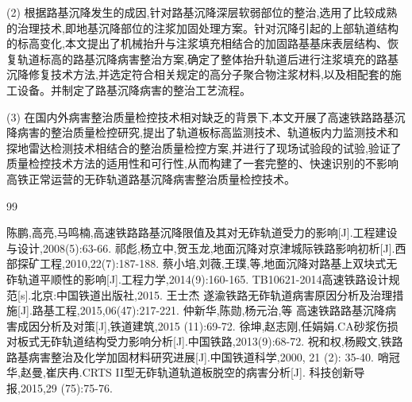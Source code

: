 \documentclass[a4paper,12pt]{ctexrep}
\begin{document}
(2) 根据路基沉降发生的成因,针对路基沉降深层软弱部位的整治,选用了比较成熟的治理技术,即地基沉降部位的注浆加固处理方案。针对沉降引起的上部轨道结构的标高变化,本文提出了机械抬升与注浆填充相结合的加固路基基床表层结构、恢复轨道标高的路基沉降病害整治方案,确定了整体抬升轨道后进行注浆填充的路基沉降修复技术方法,并选定符合相关规定的高分子聚合物注浆材料,以及相配套的施工设备。并制定了路基沉降病害的整治工艺流程。

(3) 在国内外病害整治质量检控技术相对缺乏的背景下,本文开展了高速铁路路基沉降病害的整治质量检控研究,提出了轨道板标高监测技术、轨道板内力监测技术和探地雷达检测技术相结合的整治质量检控方案,并进行了现场试验段的试验,验证了质量检控技术方法的适用性和可行性,从而构建了一套完整的、快速识别的不影响高铁正常运营的无砟轨道路基沉降病害整治质量检控技术。


\begin{thebibliography}{99}

 陈鹏,高亮,马鸣楠,高速铁路路基沉降限值及其对无砟轨道受力的影响[J].工程建设与设计,2008(5):63-66.
 祁彪,杨立中,贺玉龙,地面沉降对京津城际铁路影响初析[J].西部探矿工程,2010,22(7):187-188.
 蔡小培,刘薇,王璞,等,地面沉降对路基上双块式无砟轨道平顺性的影响[J].工程力学,2014(9):160-165.
 TB10621-2014高速铁路设计规范[s].北京:中国铁道出版社,2015.
 王士杰 遂渝铁路无砟轨道病害原因分析及治理措施[J].路基工程,2015,06(47):217-221.
 仲新华,陈勋,杨元治,等 高速铁路路基沉降病害成因分析及对策[J],铁道建筑,2015 (11):69-72.
 徐坤,赵志刚,任娟娟.CA砂浆伤损对板式无砟轨道结构受力影响分析[J].中国铁路,2013(9):68-72.
 祝和权,杨殿文,铁路路基病害整治及化学加固材料研究进展[J].中国铁道科学,2000, 21 (2): 35-40.
 哨冠华,赵曼,崔庆冉.CRTS II型无砟轨道轨道板脱空的病害分析[J]. 科技创新导报,2015,29 (75):75-76.

\end{thebibliography}
\end{document}
